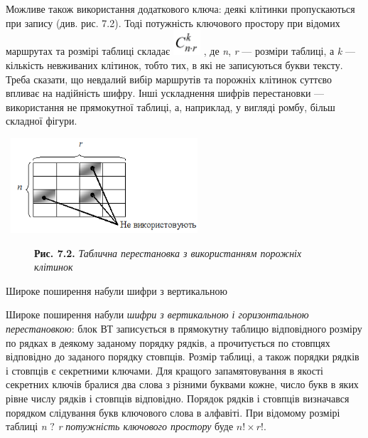 \bigskip

Можливе також використання додаткового ключа: деякі клітинки пропускаються при
запису (див. рис. 7.2). Тоді потужність ключового простору при відомих
маршрутах та розмірі таблиці складає 
\includegraphics[width=0.4016in,height=0.3681in]{crypt-img/crypt-img67.png} ,
де \textit{n}, \textit{r }--- розміри таблиці, а \textit{k}\textit{ }--- кількість
невживаних клітинок, тобто тих, в які не записуються букви тексту. Треба
сказати, що невдалий  вибір маршрутів та порожніх клітинок суттєво впливає на
надійність шифру. Інші ускладнення шифрів перестановки --- використання не
прямокутної таблиці, а, наприклад, у вигляді ромбу, більш складної фігури.


\bigskip


\bigskip

{\centering 
\includegraphics[width=2.8854in,height=1.3854in]{crypt-img/crypt-img68.png}
\par}



\begin{figure}
\centering
\begin{minipage}{6.1283in}
{\centering
\textbf{Рис. 7.2. }\textit{Таблична перестановка з використанням порожніх
}\textit{\textcolor[rgb]{0.0,0.5019608,0.0}{клітинок}}
\par}


\bigskip


\bigskip


\bigskip


\bigskip
\end{minipage}
\end{figure}
Широке поширення набули шифри з вертикальною 


\bigskip

\textbf{ }Широке \textcolor[rgb]{0.0,0.5019608,0.0}{поширення} набули
\textit{шифри з вертикальною і горизонтальною перестановкою}: блок ВТ
записується  в прямокутну таблицю відповідного розміру по рядках в деякому
заданому порядку рядків, а прочитується по стовпцях відповідно до заданого
порядку стовпців. Розмір таблиці, а також порядки рядків і стовпців є
секретними ключами. Для кращого запам{\textquotesingle}ятовування в якості
секретних ключів бралися  два слова з різними буквами кожне, число букв в яких
рівне числу рядків і стовпців відповідно. Порядок рядків і стовпців визначався
порядком слідування букв ключового слова в алфавіті.  При відомому розмірі
таблиці  \textit{n} ${?}$ \textit{r }\textit{ потужність ключового простору
}буде ${n!\times r!}$.

